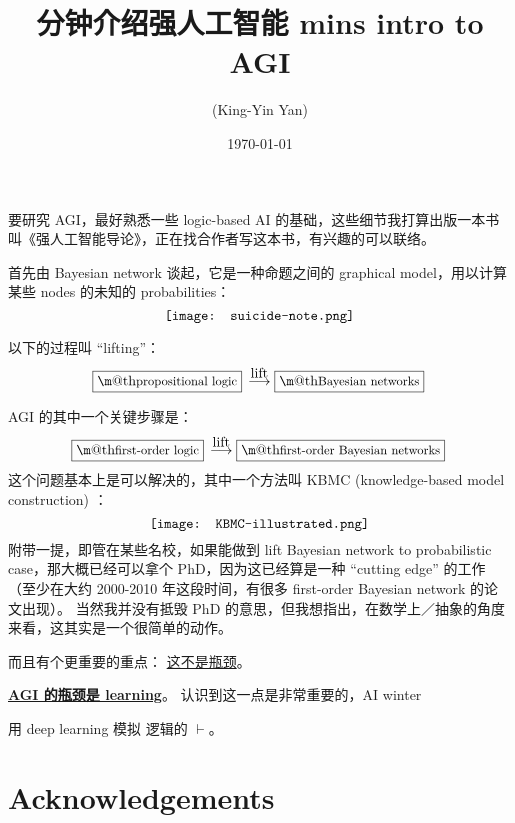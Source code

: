 \documentclass[orivec]{llncs}
\title{
\ifdefined\chinchin
10 分钟介绍强人工智能
\else
10 mins intro to AGI
\fi
}
\author{\usebox{\MyName} (King-Yin Yan)
}
\institute{General.Intelligence@Gmail.com}
\date{\today}
\makeatletter
\renewcommand{\boxed}[1]{\fbox{\m@th$\displaystyle\scalebox{0.9}{#1}$} \,}
\makeatother
\begin{document}
\let\labelitemi\labelitemii

\maketitle

\noindent
\makebox[\linewidth]{\small \today}

\setlength{\parindent}{0em}
\setlength{\parskip}{2.8ex plus0.8ex minus0.8ex}

\begin{abstract}
\end{abstract}


要研究 AGI，最好熟悉一些 logic-based AI 的基础，这些细节我打算出版一本书叫《强人工智能导论》，正在找合作者写这本书，有兴趣的可以联络。


首先由 Bayesian network 谈起，它是一种命题之间的 graphical model，用以计算某些 nodes 的未知的 probabilities：
\begin{equation}
\vcenter{\hbox{\texttt{[image: suicide-note.png]}}}
\end{equation}

以下的过程叫 ``lifting''：
\begin{equation}
	\boxed{propositional logic} \stackrel{\mbox{lift}}{\longrightarrow} \boxed{Bayesian networks}
\end{equation}

AGI 的其中一个关键步骤是：
\begin{equation}
\boxed{first-order logic} \stackrel{\mbox{lift}}{\longrightarrow} \boxed{first-order Bayesian networks}
\end{equation}
这个问题基本上是可以解决的，其中一个方法叫 KBMC (knowledge-based model construction) ：
\begin{equation}
\vcenter{\hbox{\texttt{[image: KBMC-illustrated.png]}}}
\end{equation}
附带一提，即管在某些名校，如果能做到 lift Bayesian network to probabilistic case，那大概已经可以拿个 PhD，因为这已经算是一种 ``cutting edge'' 的工作（至少在大约 2000-2010 年这段时间，有很多 first-order Bayesian network 的论文出现）。 当然我并没有抵毁 PhD 的意思，但我想指出，在数学上／抽象的角度来看，这其实是一个很简单的动作。 

而且有个更重要的重点：  \uline{这不是瓶颈}。

\underline{\textbf{AGI 的瓶颈是 learning}}。  认识到这一点是非常重要的，AI winter

用 deep learning 模拟 逻辑的 $\vdash$。



\section*{Acknowledgements}


\end{document}
